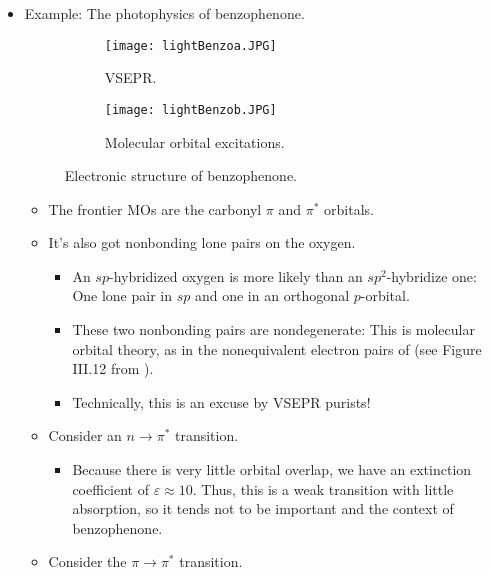 \documentclass[../notes.tex]{subfiles}
\begin{document}
\begin{itemize}
\begin{itemize}
    \end{itemize}
    \item Example: The photophysics of benzophenone.
    \begin{figure}[H]
        \centering
        \begin{subfigure}[b]{0.38\linewidth}
            \centering
            \texttt{[image: lightBenzoa.JPG]}
            \caption{VSEPR.}
            \label{fig:lightBenzoa}
        \end{subfigure}
        \begin{subfigure}[b]{0.6\linewidth}
            \centering
            \texttt{[image: lightBenzob.JPG]}
            \caption{Molecular orbital excitations.}
            \label{fig:lightBenzob}
        \end{subfigure}
        \caption{Electronic structure of benzophenone.}
        \label{fig:lightBenzo}
    \end{figure}
    \begin{itemize}
        \item The frontier MOs are the carbonyl $\pi$ and $\pi^*$ orbitals.
        \item It's also got nonbonding lone pairs on the oxygen.
        \begin{itemize}
            \item An $sp$-hybridized oxygen is more likely than an $sp^2$-hybridize one: One lone pair in $sp$ and one in an orthogonal $p$-orbital.
            \item These two nonbonding pairs are nondegenerate: This is molecular orbital theory, as in the nonequivalent electron pairs of  (see Figure III.12 from \textcite{bib:CHEM20100Notes}).
            \item Technically, this is an excuse by VSEPR purists!
        \end{itemize}
        \item Consider an $n\to\pi^*$ transition.
        \begin{itemize}
            \item Because there is very little orbital overlap, we have an extinction coefficient of $\varepsilon\approx 10$. Thus, this is a weak transition with little absorption, so it tends not to be important and the context of benzophenone.
        \end{itemize}
        \item Consider the $\pi\to\pi^*$ transition.
        \begin{itemize}

\end{itemize}
\end{itemize}
\end{itemize}
\end{document}
